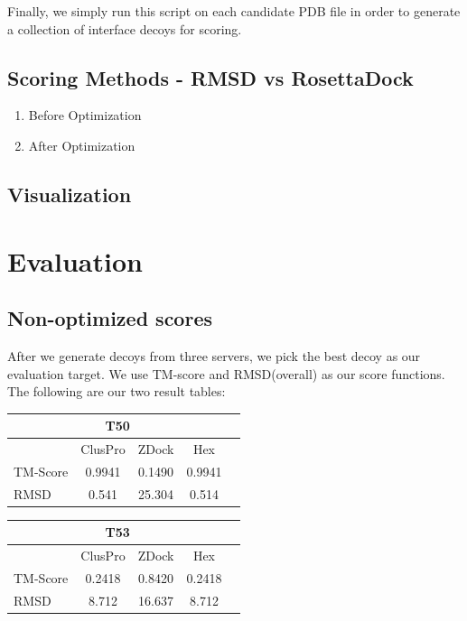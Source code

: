 \documentclass{article}
\begin{document}
Finally, we simply run this script on each candidate PDB file in order to generate a collection of interface decoys for scoring.

\subsection{Scoring Methods - RMSD vs RosettaDock}

\begin{enumerate}

\item Before Optimization



\item After Optimization



\end{enumerate}

\subsection{Visualization}



\section{Evaluation}

\subsection{Non-optimized scores}

After we generate decoys from three servers, we pick the best decoy as our evaluation target. We use TM-score and RMSD(overall) as our score functions. The following are our two result tables:

\begin{center}
\begin{tabular}{|l|c|c|c|r|}
\multicolumn{4}{c}{T50} \\
    \hline
      & ClusPro & ZDock & Hex \\ \hline
    TM-Score & 0.9941 & 0.1490 & 0.9941 \\ \hline
    RMSD & 0.541 & 25.304 & 0.514 \\
    \hline
    \end{tabular}
\end{center}

\begin{center}
\begin{tabular}{|l|c|c|c|r|}
\multicolumn{4}{c}{T53} \\
    \hline
      & ClusPro & ZDock & Hex \\ \hline
    TM-Score & 0.2418 & 0.8420 & 0.2418 \\ \hline
    RMSD & 8.712 & 16.637 & 8.712 \\
    \hline
    \end{tabular}
\end{center}
\end{document}
